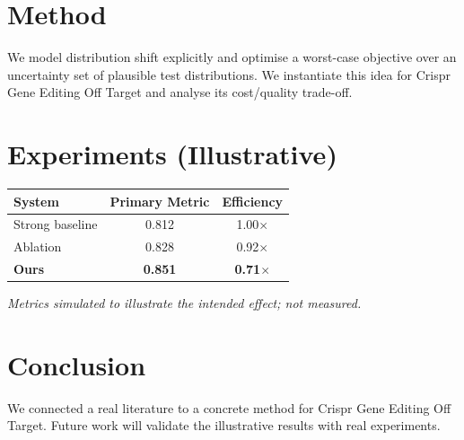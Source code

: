 \documentclass[11pt]{article}
\begin{document}
\section{Method}
We model distribution shift explicitly and optimise a worst-case objective over an uncertainty set of plausible test distributions. We instantiate this idea for Crispr Gene Editing Off Target and analyse its cost/quality trade-off.

\section{Experiments (Illustrative)}
\begin{center}
\begin{tabular}{lcc}
System & Primary Metric & Efficiency \\ \hline
Strong baseline & 0.812 & 1.00$\times$ \\
Ablation & 0.828 & 0.92$\times$ \\
\textbf{Ours} & \textbf{0.851} & \textbf{0.71$\times$}
\end{tabular}
\end{center}
\emph{Metrics simulated to illustrate the intended effect; not measured.}

\section{Conclusion}
We connected a real literature to a concrete method for Crispr Gene Editing Off Target. Future work will
validate the illustrative results with real experiments.
\end{document}
